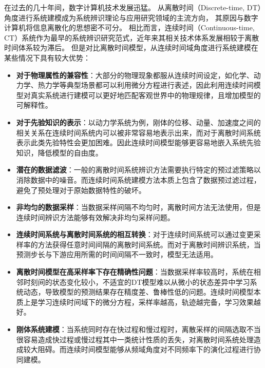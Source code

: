 在过去的几十年间，数字计算机技术发展迅猛。
从离散时间（Discrete-time, DT）角度进行系统建模成为系统辨识理论与应用研究领域的主流方向，
其原因与数字计算机将信息离散化的思想密不可分。
相比而言，连续时间（Continuous-time, CT）系统作为最早的系统辨识研究范式，近年来其相关技术体系发展相较于离散时间体系较为滞后。
但是对比离散时间模型，从连续时间域角度进行系统建模在某些情况下具有较大优势：
\begin{itemize}
\setlength{\itemsep}{0pt}
\setlength{\parsep}{0pt}
\setlength{\parskip}{0pt}
\setlength{\topsep}{0pt}
\setlength{\partopsep}{0pt}
\item	\textbf{对于物理属性的兼容性}：大部分的物理现象都服从连续时间设定，如化学、动力学、热力学等典型场景都可以利用微分方程进行表述，因此利用连续时间模型对真实系统进行建模可以更好地匹配客观世界中的物理规律，且增加模型的可解释性。
\item	\textbf{对于先验知识的表示}：以动力学系统为例，刚体的位移、动量、加速度之间的相关关系在连续时间系统内可以被非常容易地表示出来，而对于离散时间系统表示此类先验特性会更加困难。因此连续时间模型能够更容易地嵌入系统先验知识，降低模型的自由度。
\item \textbf{潜在的数据滤波}：一般的离散时间系统辨识方法需要执行特定的预过滤策略以消除数据中的噪音。而连续时间系统建模方法本质上包含了数据预过滤过程，避免了预处理对于原始数据特性的破坏。
\item \textbf{非均匀的数据采样}：当数据采样间隔不均匀时，离散时间方法无法使用，但是连续时间辨识方法能够有效解决非均匀采样问题。
\item \textbf{连续时间系统与离散时间系统的相互转换}：对于连续时间系统可以通过变更采样率的方法获得任意时间间隔的离散时间系统。而对于离散时间辨识系统，当预测步长与下游应用所需的时间间隔不一致时，模型无法适用。
\item \textbf{离散时间模型在高采样率下存在精确性问题}：当数据采样率较高时，系统在相邻时刻间的状态变化较小，不适宜的DT模型难以从微小的状态差异中学习系统动态，导致模型的预测结果存在精度差、鲁棒性低的问题。连续时间模型本质上是学习连续时间域下的微分方程，采样率越高，轨迹越完备，学习效果越好。
\item \textbf{刚体系统建模}：当系统同时存在快过程和慢过程时，离散采样的间隔选取不当很容易造成快过程或慢过程其中一类统计性质的丢失，对离散时间系统处理造成较大阻碍。而连续时间模型能够从频域角度对不同频率下的演化过程进行协同建模。
\end{itemize}
